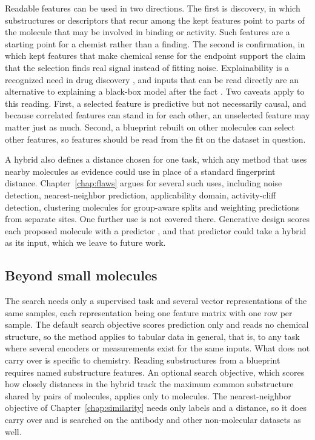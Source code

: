 Readable features can be used in two directions. The first is discovery, in which substructures or descriptors that recur among the kept features point to parts of the molecule that may be involved in binding or activity. Such features are a starting point for a chemist rather than a finding. The second is confirmation, in which kept features that make chemical sense for the endpoint support the claim that the selection finds real signal instead of fitting noise. Explainability is a recognized need in drug discovery \citep{JimenezLuna2020}, and inputs that can be read directly are an alternative to explaining a black-box model after the fact \citep{Rudin2019}. Two caveats apply to this reading. First, a selected feature is predictive but not necessarily causal, and because correlated features can stand in for each other, an unselected feature may matter just as much. Second, a blueprint rebuilt on other molecules can select other features, so features should be read from the fit on the dataset in question.

A hybrid also defines a distance chosen for one task, which any method that uses nearby molecules as evidence could use in place of a standard fingerprint distance. Chapter~\ref{chap:flaws} argues for several such uses, including noise detection, nearest-neighbor prediction, applicability domain, activity-cliff detection, clustering molecules for group-aware splits and weighting predictions from separate sites. One further use is not covered there. Generative design scores each proposed molecule with a predictor \citep{Olivecrona2017}, and that predictor could take a hybrid as its input, which we leave to future work.


\subsection{Beyond small molecules}

The search needs only a supervised task and several vector representations of the same samples, each representation being one feature matrix with one row per sample. The default search objective scores prediction only and reads no chemical structure, so the method applies to tabular data in general, that is, to any task where several encoders or measurements exist for the same inputs. What does not carry over is specific to chemistry. Reading substructures from a blueprint requires named substructure features. An optional search objective, which scores how closely distances in the hybrid track the maximum common substructure shared by pairs of molecules, applies only to molecules. The nearest-neighbor objective of Chapter~\ref{chap:similarity} needs only labels and a distance, so it does carry over and is searched on the antibody and other non-molecular datasets as well.


